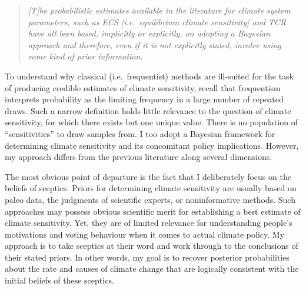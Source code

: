 \documentclass[smallextended]{svjour3}       %
\begin{document}
\begin{quote}
\emph{{[}T{]}he probabilistic estimates available in the literature for
climate system parameters, such as ECS {[}i.e.~equilibrium climate
sensitivity{]} and TCR have all been based, implicitly or explicitly, on
adopting a Bayesian approach and therefore, even if it is not explicitly
stated, involve using some kind of prior information.}
\cite[p. 922]{ipcc2013i}
\end{quote}

To understand why classical (i.e.~frequentist) methods are ill-suited
for the task of producing credible estimates of climate sensitivity,
recall that frequentism interprets probability as the limiting frequency
in a large number of repeated draws. Such a narrow definition holds
little relevance to the question of climate sensitivity, for which there
exists but one unique value. There is no population of ``sensitivities''
to draw samples from. I too adopt a Bayesian framework for determining
climate sensitivity and its concomitant policy implications. However, my
approach differs from the previous literature along several dimensions.

The most obvious point of departure is the fact that I deliberately
focus on the beliefs of sceptics. Priors for determining climate
sensitivity are usually based on paleo data, the judgments of scientific
experts, or noninformative methods. Such approaches may possess obvious
scientific merit for establishing a best estimate of climate
sensitivity. Yet, they are of limited relevance for understanding
people's motivations and voting behaviour when it comes to actual
climate policy. My approach is to take sceptics at their word and work
through to the conclusions of their stated priors. In other words, my
goal is to recover posterior probabilities about the rate and causes of
climate change that are logically consistent with the initial beliefs of
these sceptics.
\end{document}
